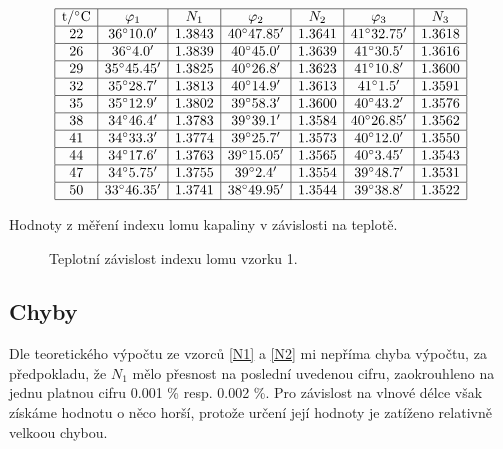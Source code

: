 \documentclass[a4paper,12pt]{article}
\begin{document}
\begin{table}
$$
\begin{array}{|c|c|c|c|c|c|c|}
\hline
\mbox{t}/^{\circ}\mbox{C}&   \varphi_1&  N_1&    \varphi_2&  N_2&    \varphi_3&  N_3 \\ \hline
22& 36^{\circ} 10.0'&    1.3843&  40^{\circ} 47.85'&   1.3641&  41^{\circ} 32.75'&   1.3618 \\ \hline
26& 36^{\circ} 4.0'& 1.3839& 40^{\circ} 45.0'&    1.3639&    41^{\circ} 30.5'&    1.3616 \\ \hline
29& 35^{\circ} 45.45'&   1.3825& 40^{\circ} 26.8'&    1.3623& 41^{\circ} 10.8'&    1.3600 \\ \hline
32& 35^{\circ} 28.7'&    1.3813& 40^{\circ} 14.9'&    1.3613& 41^{\circ} 1.5'& 1.3591 \\ \hline
35& 35^{\circ} 12.9'&    1.3802& 39^{\circ} 58.3'&    1.3600& 40^{\circ} 43.2'&    1.3576 \\ \hline
38& 34^{\circ} 46.4'&    1.3783& 39^{\circ} 39.1'&    1.3584& 40^{\circ} 26.85'&   1.3562 \\ \hline
41& 34^{\circ} 33.3'&    1.3774& 39^{\circ} 25.7'&    1.3573& 40^{\circ} 12.0'&    1.3550 \\ \hline
44& 34^{\circ} 17.6'&    1.3763& 39^{\circ} 15.05'&   1.3565& 40^{\circ} 3.45'&    1.3543 \\ \hline
47& 34^{\circ} 5.75'&    1.3755& 39^{\circ} 2.4'&     1.3554& 39^{\circ} 48.7'&    1.3531 \\ \hline
50& 33^{\circ} 46.35'&   1.3741& 38^{\circ} 49.95'&   1.3544& 39^{\circ} 38.8'&    1.3522 \\ \hline
\end{array}
$$
\caption{Hodnoty z měření indexu lomu kapaliny v závislosti na teplotě.}
\label{TT}
\end{table}

\begin{figure}

\caption{Teplotní závislost indexu lomu vzorku 1.}
\label{GT}
\end{figure}


\subsection{Chyby}
Dle teoretického výpočtu ze vzorců \ref{N1} a \ref{N2} mi nepříma chyba výpočtu, za předpokladu, že $N_1$ mělo přesnost na poslední uvedenou cifru, zaokrouhleno na jednu platnou cifru 0.001 \% resp. 0.002 \%. Pro závislost na vlnové délce však získáme hodnotu o něco horší, protože určení její hodnoty je zatíženo relativně velkoou chybou.
\end{document}
